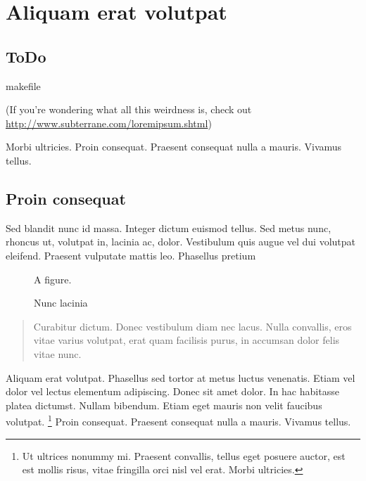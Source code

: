 \chapter{Aliquam erat volutpat}

\section*{ToDo}
makefile

(If you're wondering what all this weirdness is, check out\\
\url{http://www.subterrane.com/loremipsum.shtml})

Morbi ultricies. Proin consequat. Praesent consequat nulla a mauris.
Vivamus tellus. 

\section{Proin consequat}

Sed blandit nunc id massa. Integer dictum euismod tellus. Sed metus nunc,
rhoncus ut, volutpat in, lacinia ac, dolor. Vestibulum quis augue
vel dui volutpat eleifend. Praesent vulputate mattis leo. Phasellus pretium

\begin{figure}
    \begin{center}
        A figure.
        \caption{Nunc lacinia}
    \end{center}
\end{figure}

\begin{quote}
Curabitur dictum. Donec vestibulum diam nec lacus. Nulla convallis, eros
vitae varius volutpat, erat quam facilisis purus, in accumsan dolor felis
vitae nunc. 
\end{quote}

Aliquam erat volutpat. Phasellus sed tortor at metus luctus venenatis.
Etiam vel dolor vel lectus elementum adipiscing. Donec sit amet dolor. In
hac habitasse platea dictumst. Nullam bibendum. Etiam eget mauris non velit
faucibus volutpat. \footnote{Ut ultrices nonummy mi. Praesent convallis, tellus eget
posuere auctor, est est mollis risus, vitae fringilla orci nisl vel erat.
Morbi ultricies.} Proin consequat. Praesent consequat nulla a mauris.
Vivamus tellus. 

